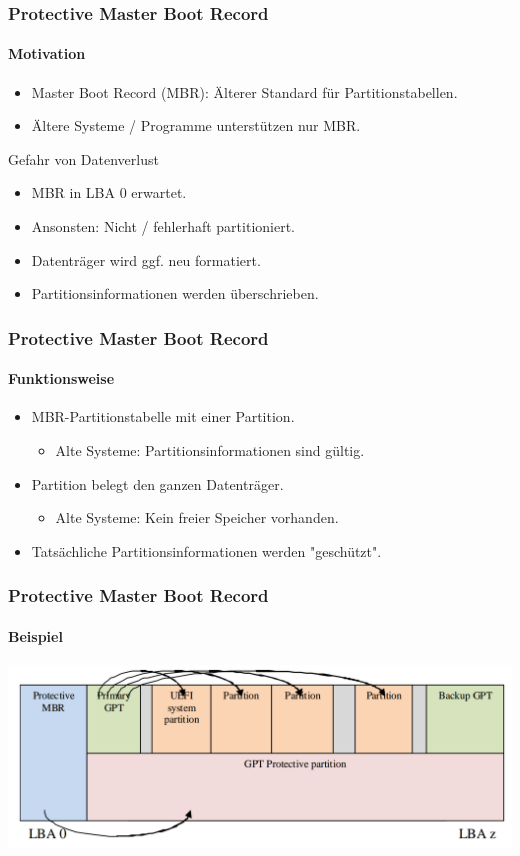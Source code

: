 
\begin{frame}
    \frametitle{Protective Master Boot Record}
    \framesubtitle{Motivation}

    \begin{itemize}
        \item Master Boot Record (MBR): Älterer Standard für Partitionstabellen.
        \item Ältere Systeme / Programme unterstützen nur MBR.
    \end{itemize}

    \vspace{0.5cm}

    \begin{alertblock}{Gefahr von Datenverlust}
        \begin{itemize}
            \item MBR in LBA 0 erwartet.
            \item Ansonsten: Nicht / fehlerhaft partitioniert.
            \item Datenträger wird ggf. neu formatiert.
            \item Partitionsinformationen werden überschrieben.
        \end{itemize}
    \end{alertblock}
\end{frame}

\begin{frame}
    \frametitle{Protective Master Boot Record}
    \framesubtitle{Funktionsweise}

    \begin{itemize}
        \item MBR-Partitionstabelle mit einer Partition.
        \begin{itemize}
            \item Alte Systeme: Partitionsinformationen sind gültig.
        \end{itemize}
        \item Partition belegt den ganzen Datenträger.
        \begin{itemize}
            \item Alte Systeme: Kein freier Speicher vorhanden.
        \end{itemize}
        \item Tatsächliche Partitionsinformationen werden "geschützt".
    \end{itemize}
\end{frame}

\begin{frame}
    \frametitle{Protective Master Boot Record}
    \framesubtitle{Beispiel}

    \centering
    \includegraphics[width=\textwidth]{content/graphics/GPT_Layout_with_protective_MBR.png}
\end{frame}
